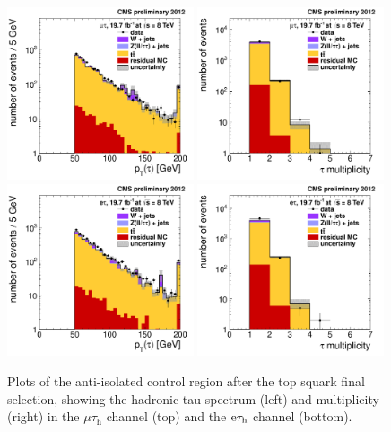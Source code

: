\documentclass[12pt]{thesis}  %
\newcommand{\tauh}{\ensuremath{\tau_{\text{h}}}\xspace}
\newcommand{\Pe}{\ensuremath{\cmsSymbolFace{e}}\xspace}
\newcommand{\mutau}{\ensuremath{\mu\tauh}\xspace}
\newcommand{\etau}{\ensuremath{\Pe\tauh}\xspace}
\begin{document}
\begin{figure}[hbtp]
  \begin{center}
    \includegraphics[width=0.49\textwidth]{figures/bkgEstim/pttauantiisoall_mutau_lqd321.pdf}
    \includegraphics[width=0.49\textwidth]{figures/bkgEstim/ntauantiiso_mutau_lqd321.pdf} \\
    \includegraphics[width=0.49\textwidth]{figures/bkgEstim/pttauantiisoall_etau_lqd321.pdf}
    \includegraphics[width=0.49\textwidth]{figures/bkgEstim/ntauantiiso_etau_lqd321.pdf}
    \caption{Plots of the anti-isolated control region after the top squark final selection, showing the hadronic tau \pt spectrum (left) and multiplicity (right) in the \mutau channel (top) and the \etau channel (bottom). \label{Bkg:fig:antiiso-lqd321}}
  \end{center}
\end{figure}
\end{document}
